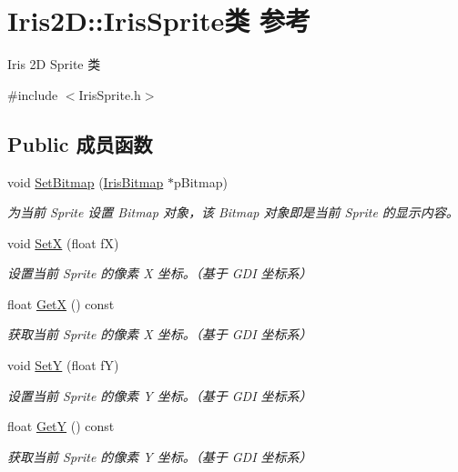 \hypertarget{class_iris2_d_1_1_iris_sprite}{}\section{Iris2D\+:\+:Iris\+Sprite类 参考}
\label{class_iris2_d_1_1_iris_sprite}


Iris 2D Sprite 类  




{\ttfamily \#include $<$Iris\+Sprite.\+h$>$}

\subsection*{Public 成员函数}
\begin{DoxyCompactItemize}
\item 
void \hyperlink{class_iris2_d_1_1_iris_sprite_a17609cfcb89b4ea714389c40f143c7af}{Set\+Bitmap} (\hyperlink{class_iris2_d_1_1_iris_bitmap}{Iris\+Bitmap} $\ast$p\+Bitmap)
\begin{DoxyCompactList}\small\item\em 为当前 Sprite 设置 Bitmap 对象，该 Bitmap 对象即是当前 Sprite 的显示内容。 \end{DoxyCompactList}\item 
void \hyperlink{class_iris2_d_1_1_iris_sprite_adfabb55dba020af9fe324d4abfa7f07a}{SetX} (float fX)
\begin{DoxyCompactList}\small\item\em 设置当前 Sprite 的像素 X 坐标。（基于 G\+DI 坐标系） \end{DoxyCompactList}\item 
float \hyperlink{class_iris2_d_1_1_iris_sprite_a6de92be964427290ad6daa0ee294cf21}{GetX} () const
\begin{DoxyCompactList}\small\item\em 获取当前 Sprite 的像素 X 坐标。（基于 G\+DI 坐标系） \end{DoxyCompactList}\item 
void \hyperlink{class_iris2_d_1_1_iris_sprite_a8064039bfeb3a364a8abeae7265cd429}{SetY} (float fY)
\begin{DoxyCompactList}\small\item\em 设置当前 Sprite 的像素 Y 坐标。（基于 G\+DI 坐标系） \end{DoxyCompactList}\item 
float \hyperlink{class_iris2_d_1_1_iris_sprite_afe8423cb0d34987c87f020ba3ba34b67}{GetY} () const
\begin{DoxyCompactList}\small\item\em 获取当前 Sprite 的像素 Y 坐标。（基于 G\+DI 坐标系） \end{DoxyCompactList}\item 

\end{DoxyCompactItemize}
